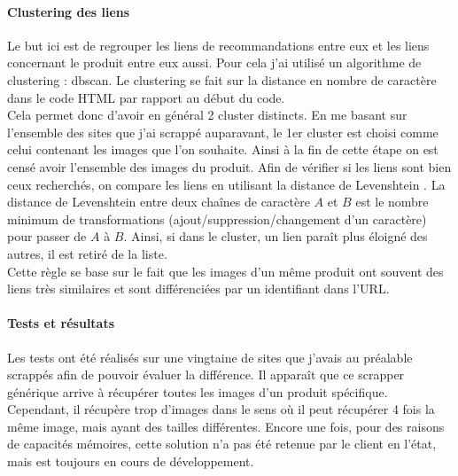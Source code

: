 \documentclass{article} %
\begin{document}
\paragraph{Clustering des liens\\}
Le but ici est de regrouper les liens de recommandations entre eux et les liens concernant le produit entre eux aussi. Pour cela j'ai utilisé un algorithme de clustering : dbscan. Le clustering se fait sur la distance en nombre de caractère dans le code HTML par rapport au début du code.\\
Cela permet donc d'avoir en général 2 cluster distincts. En me basant sur l'ensemble des sites que j'ai scrappé auparavant, le 1er cluster est choisi comme celui contenant les images que l'on souhaite. Ainsi à la fin de cette étape on est censé avoir l'ensemble des images du produit. Afin de vérifier si les liens sont bien ceux recherchés, on compare les liens en utilisant la distance de Levenshtein \cite{levenshtein}. La distance de Levenshtein entre deux chaînes de caractère $A$ et $B$ est le nombre minimum de transformations (ajout/suppression/changement d'un caractère) pour passer de $A$ à $B$. Ainsi, si dans le cluster, un lien paraît plus éloigné des autres, il est retiré de la liste.\\
Cette règle se base sur le fait que les images d'un même produit ont souvent des liens très similaires et sont différenciées par un identifiant dans l'URL. 

\paragraph{Tests et résultats\\}
Les tests ont été réalisés sur une vingtaine de sites que j'avais au préalable scrappés afin de pouvoir évaluer la différence. Il apparaît que ce scrapper générique arrive à récupérer toutes les images d'un produit spécifique. Cependant, il récupère trop d'images dans le sens où il peut récupérer 4 fois la même image, mais ayant des tailles différentes. Encore une fois, pour des raisons de capacités mémoires, cette solution n'a pas été retenue par le client en l'état, mais est toujours en cours de développement.
\end{document}
